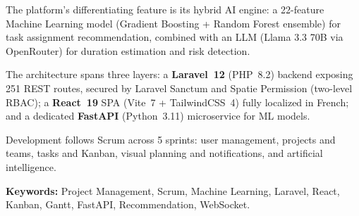 The platform's differentiating feature is its hybrid AI engine: a 22-feature Machine
Learning model (Gradient Boosting + Random Forest ensemble) for task assignment
recommendation, combined with an LLM (Llama 3.3 70B via OpenRouter) for duration
estimation and risk detection.

The architecture spans three layers: a \textbf{Laravel~12} (PHP~8.2) backend exposing
251 REST routes, secured by Laravel Sanctum and Spatie Permission (two-level RBAC);
a \textbf{React~19} SPA (Vite~7 + TailwindCSS~4) fully localized in French; and a
dedicated \textbf{FastAPI} (Python~3.11) microservice for ML models.

Development follows Scrum across 5 sprints: user management, projects and teams,
tasks and Kanban, visual planning and notifications, and artificial intelligence.

\vspace{0.5em}
\noindent\textbf{Keywords:} Project Management, Scrum, Machine Learning, Laravel,
React, Kanban, Gantt, FastAPI, Recommendation, WebSocket.
